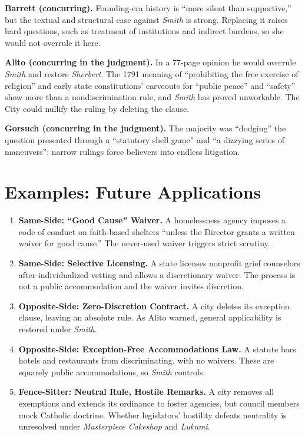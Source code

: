 \documentclass[12pt]{article}
\begin{document}
\textbf{Barrett (concurring).} Founding-era history is ``more silent than supportive,'' but the textual and structural case against \textit{Smith} is strong. Replacing it raises hard questions, such as treatment of institutions and indirect burdens, so she would not overrule it here.

\textbf{Alito (concurring in the judgment).} In a 77-page opinion he would overrule \textit{Smith} and restore \textit{Sherbert}. The 1791 meaning of ``prohibiting the free exercise of religion'' and early state constitutions' carveouts for ``public peace'' and ``safety'' show more than a nondiscrimination rule, and \textit{Smith} has proved unworkable. The City could nullify the ruling by deleting the clause.

\textbf{Gorsuch (concurring in the judgment).} The majority was ``dodging'' the question presented through a ``statutory shell game'' and ``a dizzying series of maneuvers''; narrow rulings force believers into endless litigation.

\section{Examples: Future Applications}

\begin{enumerate}
\item \textbf{Same-Side: ``Good Cause'' Waiver.} A homelessness agency imposes a code of conduct on faith-based shelters ``unless the Director grants a written waiver for good cause.'' The never-used waiver triggers strict scrutiny.
\item \textbf{Same-Side: Selective Licensing.} A state licenses nonprofit grief counselors after individualized vetting and allows a discretionary waiver. The process is not a public accommodation and the waiver invites discretion.
\item \textbf{Opposite-Side: Zero-Discretion Contract.} A city deletes its exception clause, leaving an absolute rule. As Alito warned, general applicability is restored under \textit{Smith}.
\item \textbf{Opposite-Side: Exception-Free Accommodations Law.} A statute bars hotels and restaurants from discriminating, with no waivers. These are squarely public accommodations, so \textit{Smith} controls.
\item \textbf{Fence-Sitter: Neutral Rule, Hostile Remarks.} A city removes all exemptions and extends its ordinance to foster agencies, but council members mock Catholic doctrine. Whether legislators' hostility defeats neutrality is unresolved under \textit{Masterpiece Cakeshop} and \textit{Lukumi}.
\end{enumerate}
\end{document}
